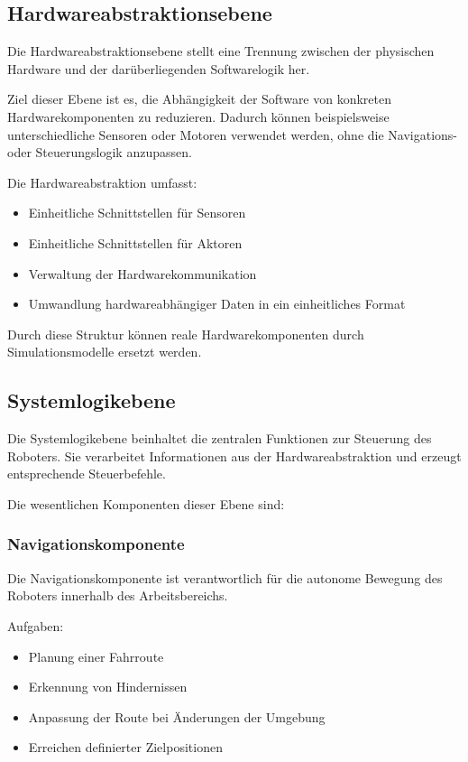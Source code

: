 \subsection{Hardwareabstraktionsebene}\label{hardwareabstraktionsebene}

Die Hardwareabstraktionsebene stellt eine Trennung zwischen der
physischen Hardware und der darüberliegenden Softwarelogik her.

Ziel dieser Ebene ist es, die Abhängigkeit der Software von konkreten
Hardwarekomponenten zu reduzieren. Dadurch können beispielsweise
unterschiedliche Sensoren oder Motoren verwendet werden, ohne die
Navigations- oder Steuerungslogik anzupassen.

Die Hardwareabstraktion umfasst:

\begin{itemize}
\tightlist
\item
  Einheitliche Schnittstellen für Sensoren
\item
  Einheitliche Schnittstellen für Aktoren
\item
  Verwaltung der Hardwarekommunikation
\item
  Umwandlung hardwareabhängiger Daten in ein einheitliches Format
\end{itemize}

Durch diese Struktur können reale Hardwarekomponenten durch
Simulationsmodelle ersetzt werden.

\subsection{Systemlogikebene}\label{systemlogikebene}

Die Systemlogikebene beinhaltet die zentralen Funktionen zur Steuerung
des Roboters. Sie verarbeitet Informationen aus der Hardwareabstraktion
und erzeugt entsprechende Steuerbefehle.

Die wesentlichen Komponenten dieser Ebene sind:

\subsubsection{Navigationskomponente}\label{navigationskomponente}

Die Navigationskomponente ist verantwortlich für die autonome Bewegung
des Roboters innerhalb des Arbeitsbereichs.

Aufgaben:

\begin{itemize}
\tightlist
\item
  Planung einer Fahrroute
\item
  Erkennung von Hindernissen
\item
  Anpassung der Route bei Änderungen der Umgebung
\item
  Erreichen definierter Zielpositionen
\end{itemize}

